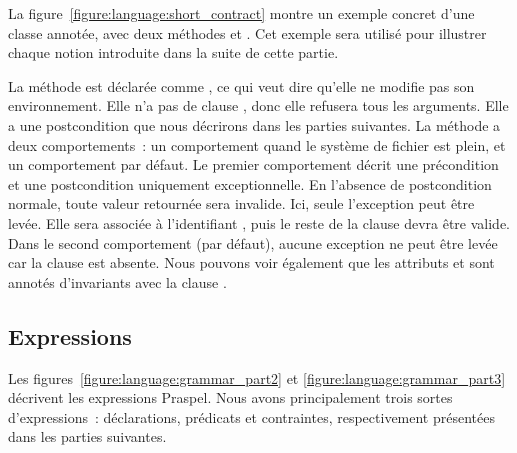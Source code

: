 \begin{example} La
figure~\ref{figure:language:short_contract} montre un exemple concret d'une
classe  annotée, avec deux méthodes  et
. Cet exemple sera utilisé pour illustrer chaque notion introduite
dans la suite de cette partie.

La méthode  est déclarée comme , ce qui veut dire
qu'elle ne modifie pas son environnement. Elle n'a pas de clause \arequires,
donc elle refusera tous les arguments. Elle a une postcondition que nous
décrirons dans les parties suivantes. La méthode  a deux
comportements~: un comportement  quand le système de fichier est
plein, et un comportement par défaut. Le premier comportement décrit une
précondition et une postcondition uniquement exceptionnelle. En l'absence de
postcondition normale, toute valeur retournée sera invalide. Ici, seule
l'exception  peut être levée. Elle sera associée à
l'identifiant , puis le reste de la clause devra être valide. Dans le
second comportement (par défaut), aucune exception ne peut être levée car la
clause \athrowable est absente. Nous pouvons voir également que les attributs
 et  sont annotés d'invariants avec la clause
\ainvariant.

\end{example}

\subsection{Expressions}
\label{subsection:language:expressions}

Les figures~\ref{figure:language:grammar_part2} et
\ref{figure:language:grammar_part3} décrivent les expressions Praspel. Nous
avons principalement trois sortes d'expressions~: déclarations, prédicats et
contraintes, respectivement présentées dans les parties suivantes.

